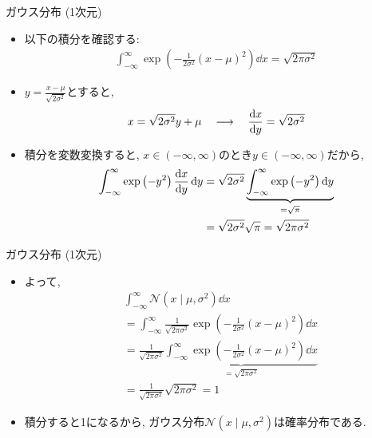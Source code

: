 \documentclass[dvipdfmx,notheorems,t]{beamer}
\begin{document}
\begin{frame}{ガウス分布 (1次元)}
\begin{itemize}
  \item 以下の積分を確認する:
  \begin{align*}
    \int_{-\infty}^\infty \exp \left( -\frac{1}{2 \sigma^2} \left( x - \mu \right)^2 \right) \dd{x}
      = \sqrt{2 \pi \sigma^2}
  \end{align*}
  \item $y = \frac{x - \mu}{\sqrt{2 \sigma^2}}$とすると,
  \begin{align*}
    x = \sqrt{2 \sigma^2} y + \mu \quad \longrightarrow \quad
      \dv{x}{y} = \sqrt{2 \sigma^2}
  \end{align*}
  \item 積分を変数変換すると, $x \in (-\infty, \infty)$のとき$y \in (-\infty, \infty)$だから,
  \begin{align*}
    \int_{-\infty}^\infty \exp \left( -y^2 \right) \dv{x}{y} \dd{y}
      &= \sqrt{2 \sigma^2} \underbrace{\int_{-\infty}^\infty \exp \left( -y^2 \right) \dd{y}}_{= \sqrt{\pi}} \\
      &= \sqrt{2 \sigma^2} \sqrt{\pi} = \sqrt{2 \pi \sigma^2}
  \end{align*}
\end{itemize}
\end{frame}

\begin{frame}{ガウス分布 (1次元)}
\begin{itemize}
  \item よって,
  \begin{align*}
    & \int_{-\infty}^\infty \mathcal{N}(x \mid \mu, \sigma^2) \dd{x} \\
    &= \int_{-\infty}^\infty \frac{1}{\sqrt{2 \pi \sigma^2}}
      \exp \left( -\frac{1}{2 \sigma^2} \left( x - \mu \right)^2 \right) \dd{x} \\
    &= \frac{1}{\sqrt{2 \pi \sigma^2}} \underbrace{\int_{-\infty}^\infty
      \exp \left( -\frac{1}{2 \sigma^2} \left( x - \mu \right)^2 \right) \dd{x}}_{= \sqrt{2 \pi \sigma^2}} \\
    &= \frac{1}{\sqrt{2 \pi \sigma^2}} \sqrt{2 \pi \sigma^2} = 1
  \end{align*}
  \item 積分すると1になるから, ガウス分布$\mathcal{N}(x \mid \mu, \sigma^2)$は確率分布である.
\end{itemize}
\end{frame}
\end{document}
